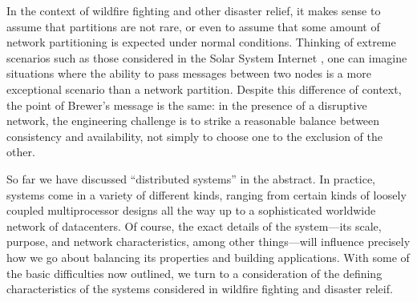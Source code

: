 In the context of wildfire fighting and other disaster relief, it makes sense to
assume that partitions are not rare,
or even to assume that some amount of network partitioning is expected under
normal conditions. Thinking of extreme scenarios such as those considered in the
Solar System Internet \cite{2016nasaSSI}, one can imagine situations where the
ability to pass messages between two nodes is a more exceptional scenario than a
network partition. Despite this difference of context, the point of Brewer's
message is the same: in the presence of a disruptive network, the engineering
challenge is to strike a reasonable balance between consistency and
availability, not simply to choose one to the exclusion of the other.

So far we have discussed ``distributed systems'' in the abstract. In practice,
systems come in a variety of different kinds, ranging from certain kinds of
loosely coupled multiprocessor designs all the way up to a sophisticated
worldwide network of datacenters. Of course, the exact details of the
system---its scale, purpose, and network characteristics, among other
things---will influence precisely how we go about balancing its properties and
building applications. With some of the basic difficulties now outlined, we turn
to a consideration of the defining characteristics of the systems considered in
wildfire  fighting and disaster releif.

